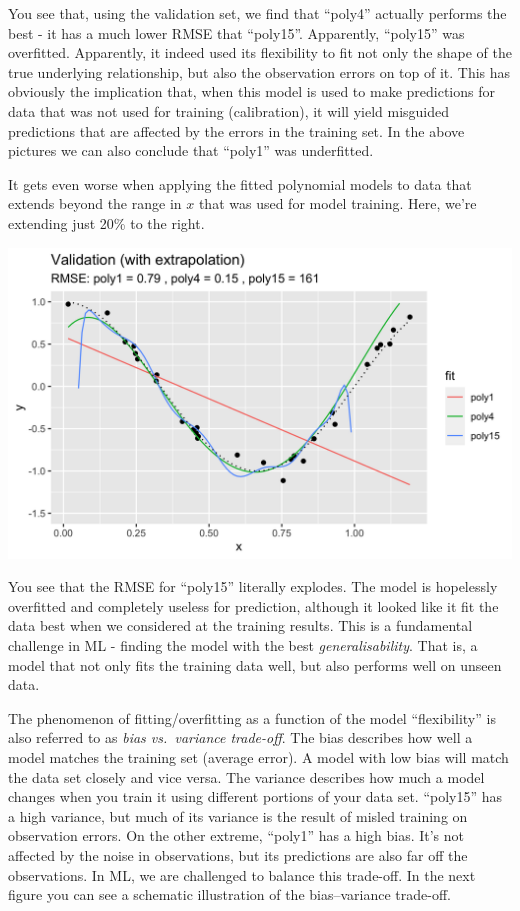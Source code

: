 \documentclass[
]{book}
\begin{document}
You see that, using the validation set, we find that ``poly4'' actually performs the best - it has a much lower RMSE that ``poly15''. Apparently, ``poly15'' was overfitted. Apparently, it indeed used its flexibility to fit not only the shape of the true underlying relationship, but also the observation errors on top of it. This has obviously the implication that, when this model is used to make predictions for data that was not used for training (calibration), it will yield misguided predictions that are affected by the errors in the training set. In the above pictures we can also conclude that ``poly1'' was underfitted.

It gets even worse when applying the fitted polynomial models to data that extends beyond the range in \(x\) that was used for model training. Here, we're extending just 20\% to the right.

\includegraphics{./figures/validation_extrapolation.png}

You see that the RMSE for ``poly15'' literally explodes. The model is hopelessly overfitted and completely useless for prediction, although it looked like it fit the data best when we considered at the training results. This is a fundamental challenge in ML - finding the model with the best \emph{generalisability}. That is, a model that not only fits the training data well, but also performs well on unseen data.

The phenomenon of fitting/overfitting as a function of the model ``flexibility'' is also referred to as \emph{bias vs.~variance trade-off}. The bias describes how well a model matches the training set (average error). A model with low bias will match the data set closely and vice versa. The variance describes how much a model changes when you train it using different portions of your data set. ``poly15'' has a high variance, but much of its variance is the result of misled training on observation errors. On the other extreme, ``poly1'' has a high bias. It's not affected by the noise in observations, but its predictions are also far off the observations. In ML, we are challenged to balance this trade-off. In the next figure you can see a schematic illustration of the bias--variance trade-off.
\end{document}

